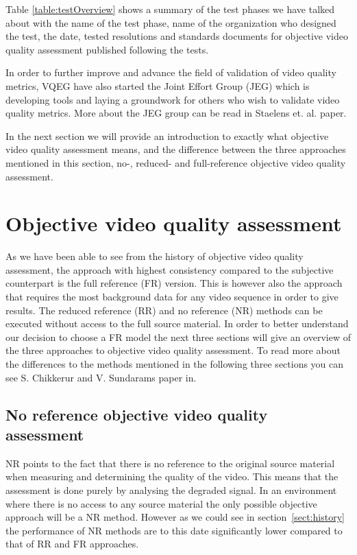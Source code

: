 Table \ref{table:testOverview} shows a summary of the test phases we have talked about with the name of the test phase, name of the organization who designed the test, the date, tested resolutions and standards documents for objective video quality assessment published following the tests.

In order to further improve and advance the field of validation of video quality metrics, VQEG have also started the Joint Effort Group (JEG) which is developing tools and laying a groundwork for others who wish to validate video quality metrics. More about the JEG group can be read in Staelens et. al. paper\cite{6065713}.

In the next section we will provide an introduction to exactly what objective video quality assessment means, and the difference between the three approaches mentioned in this section, no-, reduced- and full-reference objective video quality assessment.

\section{Objective video quality assessment}\label{sect:ovqa}
As we have been able to see from the history of objective video quality assessment, the approach with highest consistency compared to the subjective counterpart is the full reference (FR) version. This is however also the approach that requires the most background data for any video sequence in order to give results. The reduced reference (RR) and no reference (NR) methods can be executed without access to the full source material. In order to better understand our decision to choose a FR model the next three sections will give an overview of the three approaches to objective video quality assessment. To read more about the differences to the methods mentioned in the following three sections you can see S. Chikkerur and V. Sundarams paper in\cite{5710601}.

\subsection{No reference objective video quality assessment}\label{sect:nr}
NR points to the fact that there is no reference to the original source material when measuring and determining the quality of the video. This means that the assessment is done purely by analysing the degraded signal. In an environment where there is no access to any source material the only possible objective approach will be a NR method. However as we could see in section~\ref{sect:history} the performance of NR methods are to this date significantly lower compared to that of RR and FR approaches.


